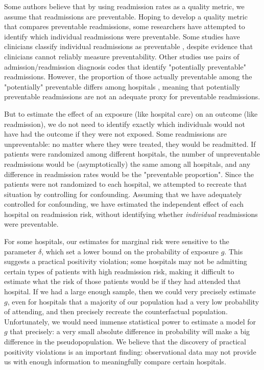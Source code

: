 \documentclass[]{article}\usepackage[]{graphicx}\usepackage[]{color}
\begin{document}
Some authors \supercite{kansagara_risk_2011} believe that by using readmission rates as a quality metric, we assume that readmissions are preventable. Hoping to develop a quality metric that compares preventable readmissions, some researchers have attempted to identify which individual readmissions were preventable. Some studies have clinicians classify individual readmissions as preventable \supercite{witherington_communication_2008, stanley_review_2008, ruiz_factors_2008}, despite evidence that clinicians cannot reliably measure preventability.\supercite{van_walraven_incidence_2011} Other studies use pairs of admission/readmission diagnosis codes that identify "potentially preventable" readmissions.\supercite{halfon_validation_2006} However, the proportion of those actually preventable among the "potentially" preventable differs among hospitals \supercite{van_walraven_proportion_2011}, meaning that potentially preventable readmissions are not an adequate proxy for preventable readmissions.\supercite{clarke_are_1990}

But to estimate the effect of an exposure (like hospital care) on an outcome (like readmission), we do not need to identify exactly which individuals would not have had the outcome if they were not exposed.\supercite{hernan_causal_2014}  Some readmissions are unpreventable: no matter where they were treated, they would be readmitted. If patients were randomized among different hospitals, the number of unpreventable readmissions would be (asymptotically) the same among all hospitals, and any difference in readmission rates would be the "preventable proportion". Since the patients were not randomized to each hospital, we attempted to recreate that situation by controlling for confounding. Assuming that we have adequately controlled for confounding, we have estimated the independent effect of each hospital on readmission risk, without identifying whether \emph{individual} readmissions were preventable.

For some hospitals, our estimates for marginal risk were sensitive to the parameter $\delta$, which set a lower bound on the probability of exposure $g$. This suggests a practical positivity violation; some hospitals may not be admitting certain types of patients with high readmission risk, making it difficult to estimate what the risk of those patients would be if they had attended that hospital.  If we had a large enough sample, then we could very precisely estimate $g$, even for hospitals that a majority of our population had a very low probability of attending, and then precisely recreate the counterfactual population. Unfortunately, we would need immense statistical power to estimate a model for $g$  that precisely: a very small absolute difference in probability will make a big difference in the pseudopopulation. We believe that the discovery of practical positivity violations is an important finding: observational data may not provide us with enough information to meaningfully compare certain hospitals. 
\end{document}
